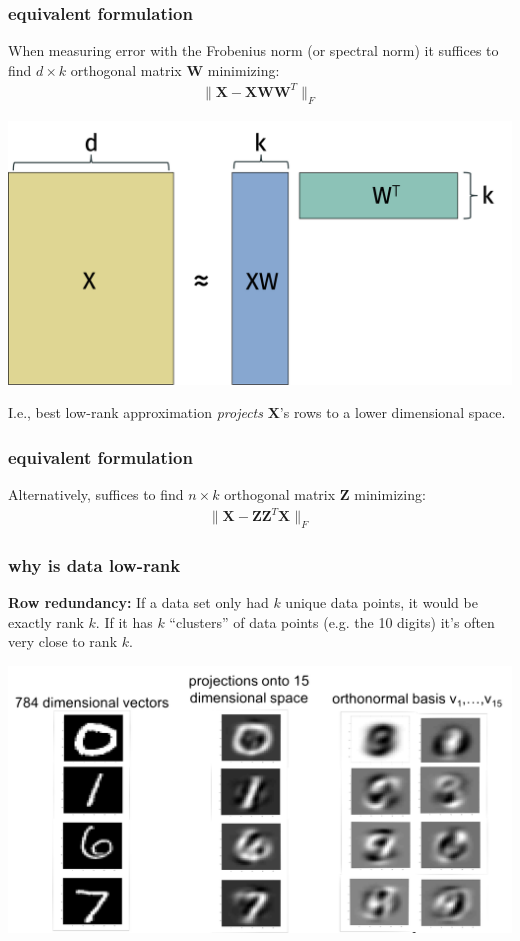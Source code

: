 \documentclass[compress]{beamer}
\newcommand{\bv}[1]{\mathbf{#1}}
\begin{document}
\begin{frame}
	\frametitle{equivalent formulation}
	When measuring error with the Frobenius norm (or spectral norm) it suffices to find
	$d \times k$ orthogonal matrix $\bv{W}$ minimizing:
	\begin{align*}
		\|\bv{X} - \bv{X}\bv{W}\bv{W}^T\|_F
	\end{align*}
	\begin{center}
		\includegraphics[width=.6\textwidth]{dualview.png}
	\end{center}
	I.e., best low-rank approximation \emph{projects} $\bv{X}$'s rows to a lower dimensional space.
\end{frame}

\begin{frame}
	\frametitle{equivalent formulation}
	Alternatively, suffices to find $n \times k$ orthogonal matrix $\bv{Z}$ minimizing:
	\begin{align*}
		\|\bv{X} - \bv{Z}\bv{Z}^T\bv{X}\|_F
	\end{align*}
\end{frame}

\begin{frame}
	\frametitle{why is data low-rank}
	\textbf{Row redundancy:} If a data set only had $k$ unique data points, it would be exactly rank $k$. If it has $k$ ``clusters'' of data points (e.g. the 10 digits) it's often very close to rank $k$. 
	\begin{center}
		\includegraphics[width=.6\textwidth]{rowview.png}
	\end{center}
\end{frame}
\end{document}
